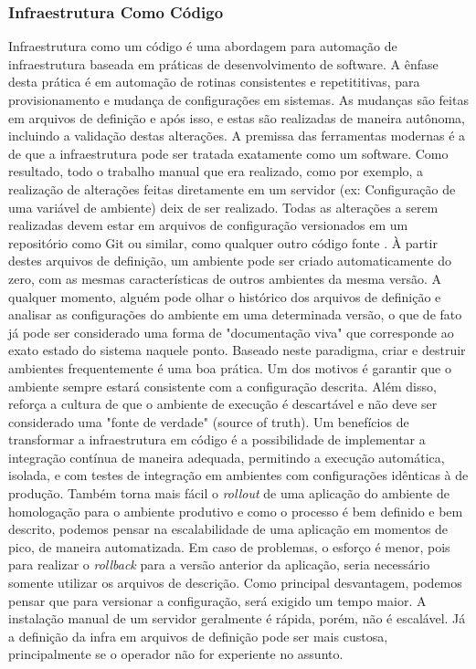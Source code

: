 \documentclass[twoside,english,brazilian]{UNISINOSartigo}
\begin{document}
\subsubsection{Infraestrutura Como Código}
Infraestrutura como um código é uma abordagem para automação de infraestrutura baseada em práticas de desenvolvimento de software. A ênfase desta prática é em automação de rotinas consistentes e repetititivas, para provisionamento e mudança de configurações em sistemas. As mudanças são feitas em arquivos de definição e após isso, e estas são realizadas de maneira autônoma, incluindo a validação destas alterações.
A premissa das ferramentas modernas é a de que a infraestrutura pode ser tratada exatamente como um software.  Como resultado, todo o trabalho manual que era realizado, como por exemplo, a realização de alterações feitas diretamente em um servidor (ex: Configuração de uma variável de ambiente) deix de ser realizado. Todas as alterações a serem realizadas devem estar em arquivos de configuração versionados em um repositório como Git ou similar, como qualquer outro código fonte \citep{Morris2016}. \newline
À partir destes arquivos de definição, um ambiente pode ser criado automaticamente do zero, com as mesmas características de outros ambientes da mesma versão. A qualquer momento, alguém pode olhar o histórico dos arquivos de definição e analisar as configurações do ambiente em uma determinada versão, o que de fato já pode ser considerado uma forma de "documentação viva" que corresponde ao exato estado do sistema naquele ponto.	\newline 
Baseado neste paradigma, criar e destruir ambientes frequentemente é uma boa prática. Um dos motivos é garantir que o ambiente sempre estará consistente com a configuração descrita. Além disso, reforça a cultura de que o ambiente de execução é descartável e não deve ser considerado uma "fonte de verdade" (source of truth).
Um benefícios de transformar a infraestrutura em código é a possibilidade de implementar a integração contínua de maneira adequada, permitindo a execução automática, isolada, e com testes de integração em ambientes com configurações idênticas à de produção. Também torna mais fácil o \textit{rollout} de uma aplicação do ambiente de homologação para o ambiente produtivo e como o processo é bem definido e bem descrito, podemos pensar na escalabilidade de uma aplicação em momentos de pico, de maneira automatizada. Em caso de problemas, o esforço é menor, pois para realizar o \textit{rollback} para a versão anterior da aplicação, seria necessário somente utilizar os arquivos de descrição. \newline
Como principal desvantagem, podemos pensar que para versionar a configuração, será exigido um tempo maior. A instalação manual de um servidor geralmente é rápida, porém, não é escalável. Já a definição da infra em arquivos de definição pode ser mais custosa, principalmente se o operador não for experiente no assunto.
\end{document}
